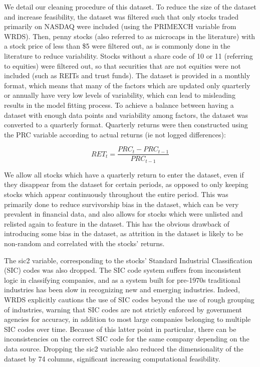 \documentclass[11pt, a4paper, table]{article}
\begin{document}
We detail our cleaning procedure of this dataset. To reduce the size of the dataset and increase feasibility, the dataset was filtered such that only stocks traded primarily on NASDAQ were included (using the PRIMEXCH variable from WRDS). Then, penny stocks (also referred to as microcaps in the literature) with a stock price of less than \$5 were filtered out, as is commonly done in the literature to reduce variability. Stocks without a share code of 10 or 11 (referring to equities) were filtered out, so that securities that are not equities were not included (such as REITs and trust funds). The dataset is provided in a monthly format, which means that many of the factors which are updated only quarterly or annually have very low levels of variability, which can lead to misleading results in the model fitting process. To achieve a balance between having a dataset with enough data points and variability among factors, the dataset was converted to a quarterly format. Quarterly returns were then constructed using the PRC variable according to actual returns (ie not logged differences):

\begin{equation}
	RET_t = \frac{PRC_t - PRC_{t-1}}{PRC_{t-1}}
\end{equation}

We allow all stocks which have a quarterly return to enter the dataset, even if they disappear from the dataset for certain periods, as opposed to only keeping stocks which appear continuously throughout the entire period. This was primarily done to reduce survivorship bias in the dataset, which can be very prevalent in financial data, and also allows for stocks which were unlisted and relisted again to feature in the dataset. This has the obvious drawback of introducing some bias in the dataset, as attrition in the dataset is likely to be non-random and correlated with the stocks' returns. 

The sic2 variable, corresponding to the stocks' Standard Industrial Classification (SIC) codes was also dropped. The SIC code system suffers from inconsistent logic in classifying companies, and as a system built for pre-1970s traditional industries has been slow in recognizing new and emerging industries. Indeed, WRDS explicitly cautions the use of SIC codes beyond the use of rough grouping of industries, warning that SIC codes are not strictly enforced by government agencies for accuracy, in addition to most large companies belonging to multiple SIC codes over time. Because of this latter point in particular, there can be inconsistencies on the correct SIC code for the same company depending on the data source. Dropping the sic2 variable also reduced the dimensionality of the dataset by 74 columns, significant increasing computational feasibility.
\end{document}
